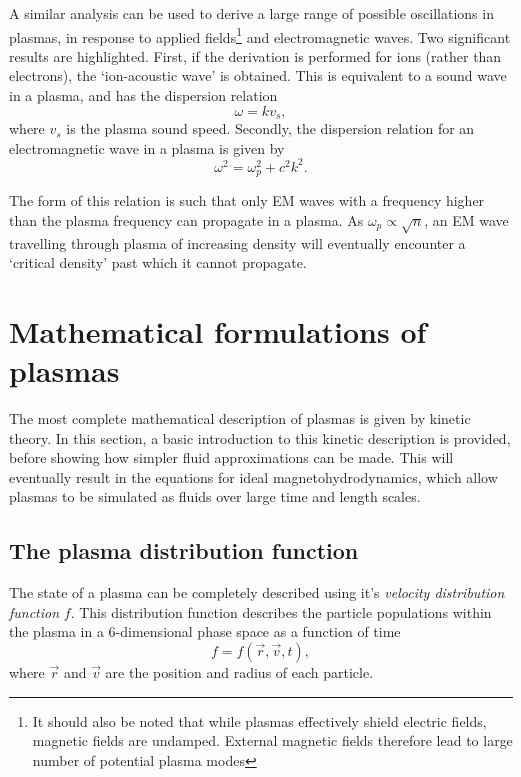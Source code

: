 A similar analysis can be used to derive a large range of possible oscillations in plasmas, in response to applied fields\footnote{It should also be noted that while plasmas effectively shield electric fields, magnetic fields are undamped. External magnetic fields therefore lead to large number of potential plasma modes} and electromagnetic waves. Two  significant results are highlighted. First, if the derivation is performed for ions (rather than electrons), the `ion-acoustic wave' is obtained. This is equivalent to a sound wave in a plasma, and has the dispersion relation
\begin{equation} \omega = k v_s, \end{equation} where $v_s$ is the plasma sound speed. Secondly, the dispersion relation for an electromagnetic wave in a plasma is given by 
\begin{equation} \omega^2 = \omega_p^2 + c^2k^2. \end{equation}

The form of this relation is such that only EM waves with a frequency higher than the plasma frequency can propagate in a plasma. As  $\omega_p \propto \sqrt{n}$, an EM wave travelling through plasma of increasing density will eventually encounter a `critical density' past which it cannot propagate. 

\section{Mathematical formulations of plasmas}
The most complete mathematical description of plasmas is given by kinetic theory. In this section, a basic introduction to this kinetic description is provided, before showing how simpler fluid approximations can be made. This will eventually result in the equations for ideal magnetohydrodynamics, which allow plasmas to be simulated as fluids over large time and length scales.

\subsection{The plasma distribution function}
The state of a plasma can be completely described using it's \textit{velocity distribution function} $f$. This distribution function describes the particle populations within the plasma in a 6-dimensional phase space as a function of time
\begin{equation} f = f(\vec{r}, \vec{v}, t), \end{equation} 
where $\vec{r}$ and $\vec{v}$ are the position and radius of each particle. 

